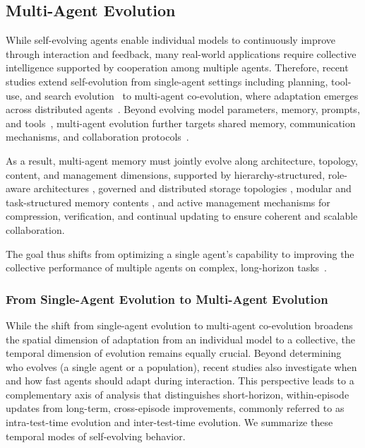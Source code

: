 \subsection{Multi-Agent Evolution}

While self-evolving agents enable individual models to continuously improve through interaction and feedback, many real-world applications require collective intelligence supported by cooperation among multiple agents. Therefore, recent studies extend self-evolution from single-agent settings including planning, tool-use, and search evolution~\cite{shinn2023reflexion, sun2023adaplanner, madaan2023self, wang2025ragen, wang2023voyager} to multi-agent co-evolution, where adaptation emerges across distributed agents~\cite{zhang2024aflow, 10.1145/2970276.2970311, wan2025rema, feng2025group, ke2025mas}. Beyond evolving model parameters, memory, prompts, and tools~\cite{chhikara2025mem0, zhao2024expel, khattab2024dspy, qiu2025alita}, multi-agent evolution further targets shared memory, communication mechanisms, and collaboration protocols~\cite{zhou2025multi, ke2025mas, Wang2024AgentWM}. 

As a result, multi-agent memory must jointly evolve along architecture, topology, content, and management dimensions, supported by hierarchy-structured, role-aware architectures \cite{zhang2025gmemory}, governed and distributed storage topologies \cite{xu2025sedm, rezazadeh2025collaborative}, modular and task-structured memory contents \cite{wang2025mirix, han2025legomem}, and active management mechanisms for compression, verification, and continual updating \cite{kaiya2023lyfe, tang2025agent} to ensure coherent and scalable collaboration.

The goal thus shifts from optimizing a single agent’s capability to improving the collective performance of multiple agents on complex, long-horizon tasks~\cite{zhang2024aflow, 10.1145/2970276.2970311, wan2025rema,novikov2025alphaevolve}.

\subsubsection{From Single-Agent Evolution to Multi-Agent Evolution}


While the shift from single-agent evolution to multi-agent co-evolution broadens the spatial dimension of adaptation from an individual model to a collective, the temporal dimension of evolution remains equally crucial. Beyond determining who evolves (a single agent or a population), recent studies also investigate when and how fast agents should adapt during interaction. This perspective leads to a complementary axis of analysis that distinguishes short-horizon, within-episode updates from long-term, cross-episode improvements, commonly referred to as intra-test-time evolution and inter-test-time evolution. We summarize these temporal modes of self-evolving behavior.

